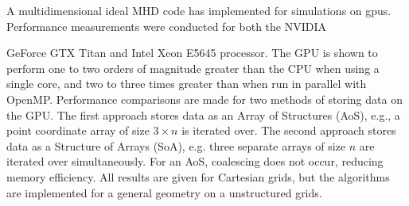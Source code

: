 \documentclass[11pt]{report}
\begin{document}
A multidimensional ideal MHD code has implemented for simulations on \glspl{gpu}.  Performance measurements were conducted for both the NVIDIA 

\abstractmultiplepage
\noindent GeForce GTX Titan and Intel Xeon E5645 processor. The GPU is shown to perform one to two orders of magnitude greater than the CPU when using a single core, and two to three times greater than when run in parallel with OpenMP.  Performance comparisons are made for two methods of storing data on the GPU.  The first approach stores data as an Array of Structures (AoS), e.g., a point coordinate array of size $3\times n$ is iterated over.  The second approach stores data as a Structure of Arrays (SoA), e.g. three separate arrays of size $n$ are iterated over simultaneously.  For an AoS, coalescing does not occur, reducing memory efficiency.    All results are given for Cartesian grids, but the algorithms are implemented for a general geometry on a unstructured grids.


\startofchapters








\appendix
\appendixeqnumbering


\end{document}
